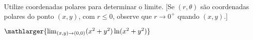 Utilize coordenadas polares para determinar o limite. [Se $(r,\theta)$ são coordenadas polares do ponto $(x,y)$, com $r\leq 0$, observe que $r \rightarrow 0^+$ quando $(x,y)
$.]


\item$\mathlarger{\lim_{(x,y)\rightarrow(0,0)} (x^2+ y ^2 ) \ln(x^2+y^2)}$